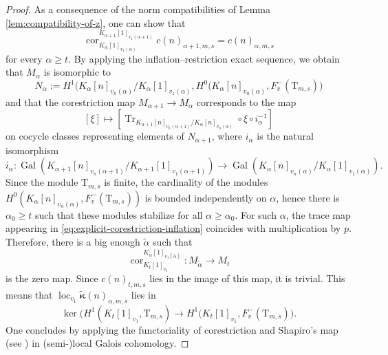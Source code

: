 \documentclass[12pt,reqno]{amsart}
\theoremstyle{definition}
\theoremstyle{remark}
\newcommand{\T}{\boldsymbol{\mathrm{T}}}
\DeclareMathOperator{\Gal}{Gal}
\DeclareMathOperator{\Tr}{Tr}
\DeclareMathOperator{\Cor}{cor}
\DeclareMathOperator{\loc}{loc}
\newcommand{\ga}{\alpha}
\newcommand{\gk}{\kappa}
\begin{document}
\begin{proof}
As a consequence of the norm compatibilities of Lemma \ref{lem:compatibility-of-z}, one can show that
\begin{equation*}
    \Cor^{K_{\ga+1}[1]_{v_1(\ga+1)}}_{K_\ga[1]_{v_1(\ga)}} c(n)_{\ga+1,m,s}=c(n)_{\ga,m,s}
\end{equation*}
for every $\ga\ge t$. By applying the inflation--restriction exact sequence, we obtain that $M_\ga$ is isomorphic to
\begin{equation*}
    N_\ga:=H^1\big(K_\ga[n]_{v_n(\ga)}/K_\ga[1]_{v_1(\ga)},H^0(K_\ga[n]_{v_n(\ga)},F_v^-(\T_{m,s})\big)
\end{equation*}
and that the corestriction map $M_{\ga+1}\to M_\ga$ corresponds to the map
\begin{equation}\label{eq:explicit-corestriction-inflation}
    [\xi]\mapsto [\Tr_{K_{\ga+1}[n]_{v_n(\ga+1)}/K_{\ga}[n]_{v_n(\ga)}}\circ \xi\circ i_{\ga}^{-1}]
\end{equation}
on cocycle classes representing elements of $N_{\ga+1}$, where $i_\ga$ is the natural isomorphism 
\begin{equation*}
    i_\ga\colon \Gal(K_{\ga+1}[n]_{v_n(\ga+1)}/K_{\ga+1}[1]_{v_1(\ga+1)})\to\Gal(K_{\ga}[n]_{v_n(\ga)}/K_{\ga}[1]_{v_1(\ga)}).
\end{equation*}
Since the module $\T_{m,s}$ is finite, the cardinality of the modules $H^0(K_\ga[n]_{v_n(\ga)},F_v^-(\T_{m,s}))$ is bounded independently on $\ga$, hence there is $\ga_0\ge t$ such that these modules stabilize for all $\ga\ge\ga_0$. For such $\ga$, the trace map appearing in \eqref{eq:explicit-corestriction-inflation} coincides with multiplication by $p$. Therefore, there is a big enough $\tilde{\ga}$ such that
\begin{equation*}
    \Cor^{K_{\tilde{\ga}}[1]_{v_1(\tilde{\ga})}}_{K_t[1]_{v_1}}\colon M_{\tilde{\ga}}\to M_t
\end{equation*}
is the zero map. Since $c(n)_{t,m,s}$ lies in the image of this map, it is trivial. This means that $\loc_{v_1}\tilde{\boldsymbol{\gk}}(n)_{\ga,m,s}$ lies in
\begin{equation*}
    \ker\big(H^1(K_t[1]_{v_1},\T_{m,s})\to H^1(K_t[1]_{v_1},F_v^{-}(\T_{m,s})\big).
\end{equation*}
One concludes by applying the functoriality of corestriction and Shapiro's map (see \cite[§3.1.2]{Skinner-Urban:Iwasawa.main-conjecture-for-GL2}) in (semi-)local Galois cohomology.
\end{proof}
\end{document}
